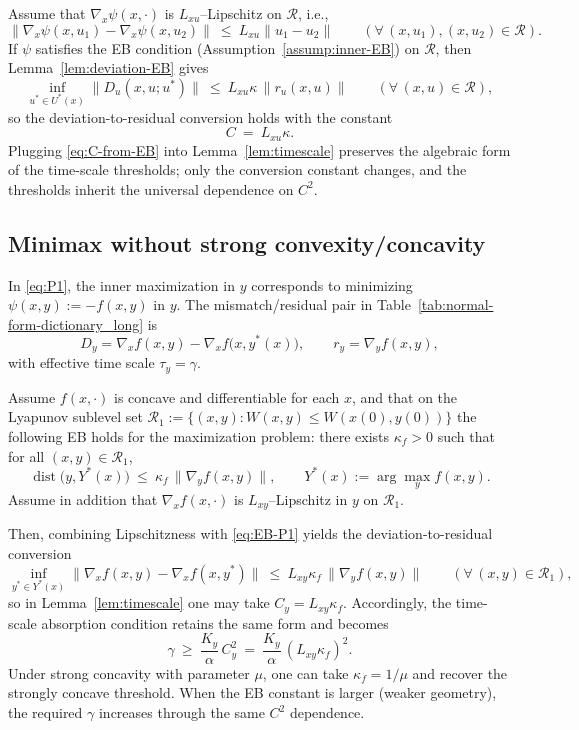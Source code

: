 \documentclass{article}
\newcommand{\1}{\mathbf{1}}
\begin{document}
Assume that $\nabla_x\psi(x,\cdot)$ is $L_{xu}$--Lipschitz on $\mathcal R$, i.e.,
\[
\|\nabla_x\psi(x,u_1)-\nabla_x\psi(x,u_2)\| \ \le\ L_{xu}\|u_1-u_2\|
\qquad(\forall\, (x,u_1),(x,u_2)\in\mathcal R).
\]
If $\psi$ satisfies the EB condition (Assumption~\ref{assump:inner-EB}) on $\mathcal R$, then Lemma~\ref{lem:deviation-EB} gives
\begin{equation}\label{eq:C-from-EB}
\inf_{u^*\in U^*(x)}
\|D_u(x,u;u^*)\|
\ \le\ L_{xu}\kappa\,\|r_u(x,u)\|
\qquad(\forall\, (x,u)\in\mathcal R),
\end{equation}
so the deviation-to-residual conversion holds with the constant
\[
C\ =\ L_{xu}\kappa.
\]
Plugging \eqref{eq:C-from-EB} into Lemma~\ref{lem:timescale} preserves the algebraic form of the time-scale thresholds;
only the conversion constant changes, and the thresholds inherit the universal dependence on $C^2$. 

\subsection{Minimax without strong convexity/concavity}\label{app:eb-p1}

In \ref{eq:P1}, the inner maximization in $y$ corresponds to minimizing $\psi(x,y):=-f(x,y)$ in $y$.
The mismatch/residual pair in Table~\ref{tab:normal-form-dictionary_long} is
\[
D_y=\nabla_x f(x,y)-\nabla_x f\bigl(x,y^*(x)\bigr),
\qquad
r_y=\nabla_y f(x,y),
\]
with effective time scale $\tau_y=\gamma$.

Assume $f(x,\cdot)$ is concave and differentiable for each $x$, and that on the Lyapunov sublevel set
$\mathcal R_1:=\{(x,y): W(x,y)\le W(x(0),y(0))\}$ the following EB holds for the maximization problem:
there exists $\kappa_f>0$ such that for all $(x,y)\in\mathcal R_1$,
\begin{equation}\label{eq:EB-P1}
\operatorname{dist}\bigl(y, Y^*(x)\bigr)\ \le\ \kappa_f\,\|\nabla_y f(x,y)\|,
\qquad
Y^*(x):=\arg\max_y f(x,y).
\end{equation}
Assume in addition that $\nabla_x f(x,\cdot)$ is $L_{xy}$--Lipschitz in $y$ on $\mathcal R_1$.

Then, combining Lipschitzness with \eqref{eq:EB-P1} yields the deviation-to-residual conversion
\[
\inf_{y^*\in Y^*(x)}
\bigl\|\nabla_x f(x,y)-\nabla_x f(x,y^*)\bigr\|
\ \le\ L_{xy}\kappa_f\,\|\nabla_y f(x,y)\|
\qquad(\forall\,(x,y)\in\mathcal R_1),
\]
so in Lemma~\ref{lem:timescale} one may take $C_y=L_{xy}\kappa_f$.
Accordingly, the time-scale absorption condition retains the same form and becomes
\[
\gamma\ \ge\ \frac{K_y}{\alpha}\,C_y^2
\ =\ \frac{K_y}{\alpha}\,(L_{xy}\kappa_f)^2.
\]
Under strong concavity with parameter $\mu$, one can take $\kappa_f=1/\mu$ and recover the strongly concave threshold.
When the EB constant is larger (weaker geometry), the required $\gamma$ increases through the same $C^2$ dependence. 
\end{document}
